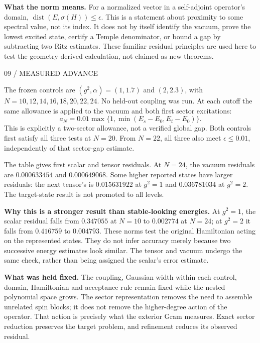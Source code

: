 \documentclass[11pt,letterpaper]{article}
\theoremstyle{plain}
\theoremstyle{definition}
\newcommand{\eyebrow}[1]{{\sffamily\small\color{teal}#1}\par}
\newcommand{\pagetitle}[2]{\eyebrow{#1}\vspace{3pt}{\LARGE #2}\par\vspace{5pt}}
\begin{document}
\textbf{What the norm means.}
For a normalized vector in a self-adjoint operator's domain,
$\operatorname{dist}(E,\sigma(H))\leq\epsilon$. This is a statement about
proximity to some spectral value, not its index. It does not by itself identify
the vacuum, prove the lowest excited state, certify a Temple denominator, or
bound a gap by subtracting two Ritz estimates. These familiar residual principles
are used here to test the geometry-derived calculation, not claimed as new theorems.

\newpage
\pagetitle{09 / MEASURED ADVANCE}{The local residual bottleneck is cleared}
The frozen controls are $(g^2,\alpha)=(1,1.7)$ and $(2,2.3)$, with
$N=10,12,14,16,18,20,22,24$. No held-out coupling was run. At each cutoff the
same allowance is applied to the vacuum and both first sector excitations:
\[
 a_N=0.01\max\{1,\min(E_s-E_0,E_t-E_0)\}.
\]
This is explicitly a two-sector allowance, not a verified global gap.
Both controls first satisfy all three tests at $N=20$. From $N=22$, all three
also meet $\epsilon\leq0.01$, independently of that sector-gap estimate.

\begin{center}\small\end{center}
The table gives first scalar and tensor residuals. At $N=24$, the vacuum
residuals are $0.000633454$ and $0.000649068$. Some higher reported states
have larger residuals: the next tensor's is $0.015631922$ at $g^2=1$ and
$0.036781034$ at $g^2=2$. The target-state result is not promoted to all levels.

\textbf{Why this is a stronger result than stable-looking energies.}
At $g^2=1$, the scalar residual falls from $0.347055$ at $N=10$ to $0.002774$
at $N=24$; at $g^2=2$ it falls from $0.416759$ to $0.004793$.
These norms test the original Hamiltonian acting on the represented states.
They do not infer accuracy merely because two successive energy estimates
look similar. The tensor and vacuum undergo the same check, rather than
being assigned the scalar's error estimate.

\textbf{What was held fixed.}
The coupling, Gaussian width within each control, domain, Hamiltonian and
acceptance rule remain fixed while the nested polynomial space grows.
The sector representation removes the need to assemble unrelated spin blocks;
it does not remove the higher-degree action of the operator. That action is
precisely what the exterior Gram measures. Exact sector reduction preserves
the target problem, and refinement reduces its observed residual.
\end{document}
